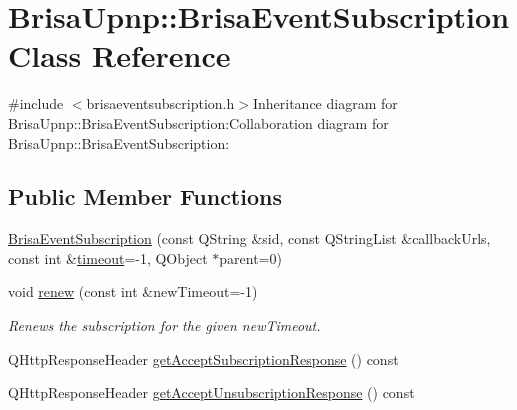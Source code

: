 \hypertarget{classBrisaUpnp_1_1BrisaEventSubscription}{
\section{BrisaUpnp::BrisaEventSubscription Class Reference}
\label{classBrisaUpnp_1_1BrisaEventSubscription}
}


{\ttfamily \#include $<$brisaeventsubscription.h$>$}Inheritance diagram for BrisaUpnp::BrisaEventSubscription:Collaboration diagram for BrisaUpnp::BrisaEventSubscription:\subsection*{Public Member Functions}
\begin{DoxyCompactItemize}
\item 
\hyperlink{classBrisaUpnp_1_1BrisaEventSubscription_ae06a65973bacd60ed46c362ba5359b81}{BrisaEventSubscription} (const QString \&sid, const QStringList \&callbackUrls, const int \&\hyperlink{classBrisaUpnp_1_1BrisaAbstractEventSubscription_afb99d42e318e002acc44740a2ca7881a}{timeout}=-\/1, QObject $\ast$parent=0)
\item 
void \hyperlink{classBrisaUpnp_1_1BrisaEventSubscription_aa5b51ef428760a2f3e653e9b4b132f5a}{renew} (const int \&newTimeout=-\/1)
\begin{DoxyCompactList}\small\item\em Renews the subscription for the given {\itshape newTimeout\/}. \item\end{DoxyCompactList}\item 
QHttpResponseHeader \hyperlink{classBrisaUpnp_1_1BrisaEventSubscription_ad5eab9edcfaf289688a67340d1fb0865}{getAcceptSubscriptionResponse} () const 
\item 
QHttpResponseHeader \hyperlink{classBrisaUpnp_1_1BrisaEventSubscription_a07a86edf216d8002832956465041f759}{getAcceptUnsubscriptionResponse} () const 
\end{DoxyCompactItemize}


